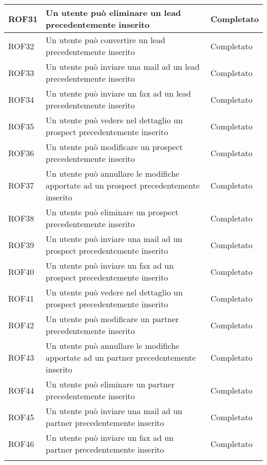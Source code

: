\begin{longtable}[h]{|p{2.5cm}|p{8cm}|p{2.5cm}|}
	\hline
	\rule[-3mm]{0mm}{0.8cm}
	ROF31&Un utente può eliminare un lead precedentemente inserito&Completato\\
	\hline
	\rule[-3mm]{0mm}{0.8cm}
	ROF32&Un utente può convertire un lead precedentemente inserito&Completato\\
	\hline
	\rule[-3mm]{0mm}{0.8cm}
	ROF33&Un utente può inviare una mail ad un lead precedentemente inserito&Completato \\
	\hline
	\rule[-3mm]{0mm}{0.8cm}
	ROF34&Un utente può inviare un fax ad un lead precedentemente inserito&Completato \\
	\hline
	\rule[-3mm]{0mm}{0.8cm}
	ROF35&Un utente può vedere nel dettaglio un prospect precedentemente inserito&Completato\\
	\hline
	\rule[-3mm]{0mm}{0.8cm}
	ROF36&Un utente può modificare un prospect precedentemente inserito&Completato\\
	\hline
	\rule[-3mm]{0mm}{0.8cm}
	ROF37&Un utente può annullare le modifiche apportate ad un prospect precedentemente inserito&Completato\\
	\hline
	\rule[-3mm]{0mm}{0.8cm}
	ROF38&Un utente può eliminare un prospect precedentemente inserito&Completato\\
	\hline
	\rule[-3mm]{0mm}{0.8cm}
	ROF39&Un utente può inviare una mail ad un prospect precedentemente inserito&Completato \\
	\hline
	\rule[-3mm]{0mm}{0.8cm}
	ROF40&Un utente può inviare un fax ad un prospect precedentemente inserito&Completato \\
	\hline
	\rule[-3mm]{0mm}{0.8cm}
	ROF41&Un utente può vedere nel dettaglio un prospect precedentemente inserito&Completato\\
	\hline
	\rule[-3mm]{0mm}{0.8cm}
	ROF42&Un utente può modificare un partner precedentemente inserito&Completato\\
	\hline
	\rule[-3mm]{0mm}{0.8cm}
	ROF43&Un utente può annullare le modifiche apportate ad un partner precedentemente inserito&Completato\\
	\hline
	\rule[-3mm]{0mm}{0.8cm}
	ROF44&Un utente può eliminare un partner precedentemente inserito&Completato\\
	\hline
	\rule[-3mm]{0mm}{0.8cm}
	ROF45&Un utente può inviare una mail ad un partner precedentemente inserito&Completato \\
	\hline
	\rule[-3mm]{0mm}{0.8cm}
	ROF46&Un utente può inviare un fax ad un partner precedentemente inserito&Completato \\
	\hline\rule[-3mm]{0mm}{0.8cm}

\end{longtable}
